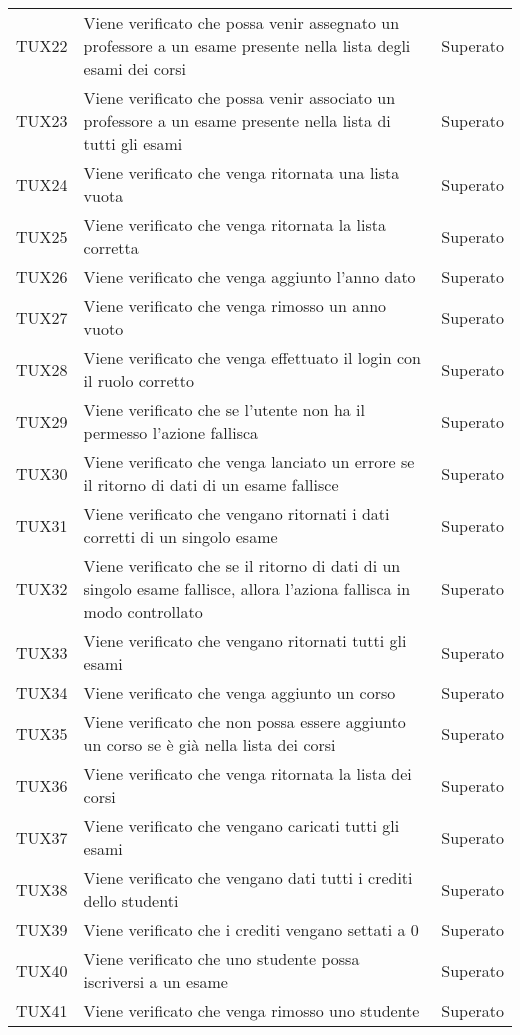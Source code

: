 \documentclass[PianoDiQualifica.tex]{subfiles}
\begin{document}
\begin{longtable}[H]{P{2cm}P{8.5cm}P{3cm}}
	TUX22 & Viene verificato che possa venir assegnato un professore a un esame presente nella lista degli esami dei corsi & Superato \\
	TUX23 & Viene verificato che possa venir associato un professore a un esame presente nella lista di tutti gli esami & Superato \\
	TUX24 & Viene verificato che venga ritornata una lista vuota & Superato \\
	TUX25 & Viene verificato che venga ritornata la lista corretta & Superato \\
	TUX26 & Viene verificato che venga aggiunto l'anno dato & Superato \\
	TUX27 & Viene verificato che venga rimosso un anno vuoto & Superato \\
	TUX28 & Viene verificato che venga effettuato il login con il ruolo corretto & Superato \\
	TUX29 & Viene verificato che se l'utente non ha il permesso l'azione fallisca & Superato \\
	TUX30 & Viene verificato che venga lanciato un errore se il ritorno di dati di un esame fallisce & Superato \\
	TUX31 & Viene verificato che vengano ritornati i dati corretti di un singolo esame & Superato \\
	TUX32 & Viene verificato che se il ritorno di dati di un singolo esame fallisce, allora l'aziona fallisca in modo controllato & Superato \\
	TUX33 & Viene verificato che vengano ritornati tutti gli esami & Superato \\
	TUX34 & Viene verificato che venga aggiunto un corso & Superato \\
	TUX35 & Viene verificato che non possa essere aggiunto un corso se è già nella lista dei corsi & Superato \\
	TUX36 & Viene verificato che venga ritornata la lista dei corsi & Superato \\
	TUX37 & Viene verificato che vengano caricati tutti gli esami & Superato \\
	TUX38 & Viene verificato che vengano dati tutti i crediti dello studenti & Superato \\
	TUX39 & Viene verificato che i crediti vengano settati a 0 & Superato \\
	TUX40 & Viene verificato che uno studente possa iscriversi a un esame & Superato \\
	TUX41 & Viene verificato che venga rimosso uno studente & Superato \\

\end{longtable}
\end{document}
